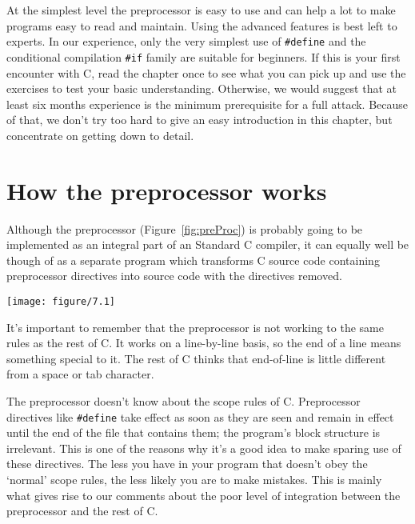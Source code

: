    At the simplest level the preprocessor is easy to use and can help
   a lot to make programs easy to read and maintain. Using the advanced
   features is best left to experts. In our experience, only the very
   simplest use of \texttt{\#define} and the conditional compilation
   \texttt{\#if} family are suitable for beginners. If this is your first
   encounter with C, read the chapter once to see what you can pick up and
   use the exercises to test your basic understanding. Otherwise, we would
   suggest that at least six months experience is the minimum prerequisite
   for a full attack. Because of that, we don't try too hard to give an easy
   introduction in this chapter, but concentrate on getting down to
   detail.


 
        \section{How the preprocessor works}
        

  

  Although the preprocessor (Figure~\ref{fig:preProc}) is probably going
   to be implemented as an integral part of an Standard C compiler, it can
   equally well be though of as a separate program which transforms C source
   code containing preprocessor directives into source code with the
   directives removed.


   \begin{figure*}[htb]\centering
     \texttt{[image: figure/7.1]}
     \caption*{Diagram showing source code
       passing through a preprocessor to become 'preprocessed source',
       which is then fed into the rest of the compiler.}
     \caption{\label{fig:preProc}The preprocessor}
   \end{figure*}



  It's important to remember that the preprocessor is not working to the
   same rules as the rest of C. It works on a line-by-line basis, so the end
   of a line means something special to it. The rest of C thinks that
   end-of-line is little different from a space or tab character.


  The preprocessor doesn't know about the scope rules of C. Preprocessor
   directives like \texttt{\#define} take effect as soon as they are seen
   and remain in effect until the end of the file that contains them; the
   program's block structure is irrelevant. This is one of the reasons why
   it's a good idea to make sparing use of these directives. The less you
   have in your program that doesn't obey the `normal' scope rules,
   the less likely you are to make mistakes. This is mainly what gives rise
   to our comments about the poor level of integration between the
   preprocessor and the rest of C.


